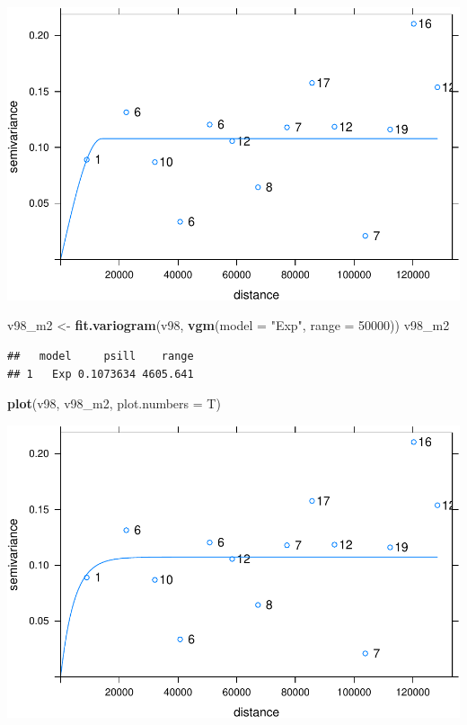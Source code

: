 \documentclass[11pt,]{article}
\newenvironment{Shaded}{\begin{snugshade}}{\end{snugshade}}
\newcommand{\KeywordTok}[1]{\textcolor[rgb]{0.13,0.29,0.53}{\textbf{#1}}}
\newcommand{\DataTypeTok}[1]{\textcolor[rgb]{0.13,0.29,0.53}{#1}}
\newcommand{\DecValTok}[1]{\textcolor[rgb]{0.00,0.00,0.81}{#1}}
\newcommand{\StringTok}[1]{\textcolor[rgb]{0.31,0.60,0.02}{#1}}
\newcommand{\NormalTok}[1]{#1}
\begin{document}
\includegraphics[width=800px]{proyecto_files/figure-latex/vgm-pre1998-ajus-exp-1}

\begin{Shaded}
\begin{Highlighting}[]
\NormalTok{v98_m2 <-}\StringTok{ }\KeywordTok{fit.variogram}\NormalTok{(v98, }\KeywordTok{vgm}\NormalTok{(}\DataTypeTok{model =} \StringTok{"Exp"}\NormalTok{, }\DataTypeTok{range =} \DecValTok{50000}\NormalTok{))}
\NormalTok{v98_m2}
\end{Highlighting}
\end{Shaded}

\begin{verbatim}
##   model     psill    range
## 1   Exp 0.1073634 4605.641
\end{verbatim}

\begin{Shaded}
\begin{Highlighting}[]
\KeywordTok{plot}\NormalTok{(v98, v98_m2, }\DataTypeTok{plot.numbers =}\NormalTok{ T)}
\end{Highlighting}
\end{Shaded}

\includegraphics[width=800px]{proyecto_files/figure-latex/vgm-pre1998-ajus-exp-2}
\end{document}
